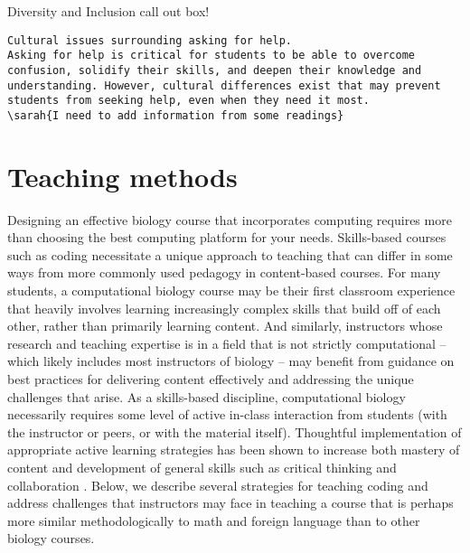 {\begin{framed}
Diversity and Inclusion call out box! 
\begin{snugshade*}
\begin{lstlisting}
Cultural issues surrounding asking for help.
Asking for help is critical for students to be able to overcome confusion, solidify their skills, and deepen their knowledge and understanding. However, cultural differences exist that may prevent students from seeking help, even when they need it most. 
\sarah{I need to add information from some readings}
\end{lstlisting}
\end{snugshade*}
\end{framed}}

\section{Teaching methods}


Designing an effective biology course that incorporates computing requires more than choosing the best computing platform for your needs. Skills-based courses such as coding necessitate a unique approach to teaching that can differ in some ways from more commonly used pedagogy in content-based courses. For many students, a computational biology course may be their first classroom experience that heavily involves learning increasingly complex skills that build off of each other, rather than primarily learning content. And similarly, instructors whose research and teaching expertise is in a field that is not strictly computational -- which likely includes most instructors of biology -- may benefit from guidance on best practices for delivering content effectively and addressing the unique challenges that arise. As a skills-based discipline, computational biology  necessarily requires some level of active in-class interaction from students (with the instructor or peers, or with the material itself). Thoughtful implementation of appropriate active learning strategies has been shown to increase both mastery of content and development of general skills such as critical thinking and collaboration \cite{faust_paulson_1998}. Below, we describe several strategies for teaching coding and address challenges that instructors may face in teaching a course that is perhaps more similar methodologically to math and foreign language than to other biology courses.

